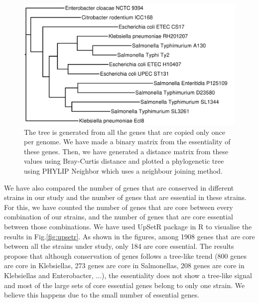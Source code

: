 \documentclass[12pt,letterpaper]{article}
\begin{document}
\begin{figure}
\centering
\includegraphics[scale=0.2]{neighbor-joining-essentiality-tree.pdf}
\caption{The tree is generated from all the genes that are copied only once per genome. We have made a binary matrix from the essentiality of these genes. Then, we have generated a distance matrix from these values using Bray-Curtis distance and plotted a phylogenetic tree using PHYLIP Neighbor which uses a neighbour joining method.}
\label{fig:neighborjoining}
\end{figure}

We have also compared the number of genes that are conserved in different strains in our study and the number of genes that are essential in these strains. For this, we have counted the number of genes that are core between every combination of our strains, and the number of genes that are core essential between those combinations. We have used UpSetR package \cite{conway_upsetr:_2016} in R to visualise the results in Fig.\@ \ref{fig:upsetr}. As shown in the figures, among 1908 genes that are core between all the strains under study, only 184 are core essential. The results propose that although conservation of genes follows a tree-like trend (800 genes are core in Klebsiellas, 273 genes are core in Salmonellas, 208 genes are core in Klebsiellas and Enterobacter, ...), the essentiality does not show a tree-like signal and most of the large sets of core essential genes belong to only one strain. We believe this happens due to the small number of essential genes.
\end{document}
